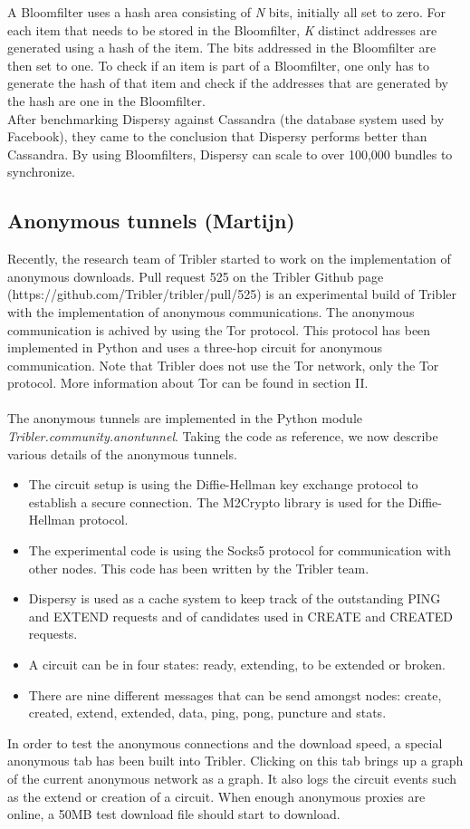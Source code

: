 \documentclass[11pt]{article}
\begin{document}
A Bloomfilter uses a hash area consisting of \emph{N} bits, initially all set to zero. For each item that needs to be stored in the Bloomfilter, \emph{K} distinct addresses are generated using a hash of the item. The bits addressed in the Bloomfilter are then set to one. To check if an item is part of a Bloomfilter, one only has to generate the hash of that item and check if the addresses that are generated by the hash are one in the Bloomfilter.\\

After benchmarking Dispersy against Cassandra (the database system used by Facebook), they came to the conclusion that Dispersy performs better than Cassandra. By using Bloomfilters, Dispersy can scale to over 100,000 bundles to synchronize.

\subsection{Anonymous tunnels (Martijn)}
\label{sec:anonymoustunnels}
Recently, the research team of Tribler started to work on the implementation of anonymous downloads. Pull request 525 on the Tribler Github page (https://github.com/Tribler/tribler/pull/525) is an experimental build of Tribler with the implementation of anonymous communications. The anonymous communication is achived by using the Tor protocol. This protocol has been implemented in Python and uses a three-hop circuit for anonymous communication. Note that Tribler does not use the Tor network, only the Tor protocol. More information about Tor can be found in section II.\\\\
The anonymous tunnels are implemented in the Python module \emph{Tribler.community.anontunnel}. Taking the code as reference, we now describe various details of the anonymous tunnels.
\begin{itemize} 
\item The circuit setup is using the Diffie-Hellman key exchange protocol to establish a secure connection. The M2Crypto library is used for the Diffie-Hellman protocol.
\item The experimental code is using the Socks5 protocol for communication with other nodes. This code has been written by the Tribler team.
\item Dispersy is used as a cache system to keep track of the outstanding PING and EXTEND requests and of candidates used in CREATE and CREATED requests.
\item A circuit can be in four states: ready, extending, to be extended or broken.
\item There are nine different messages that can be send amongst nodes: create, created, extend, extended, data, ping, pong, puncture and stats.
\end{itemize}
In order to test the anonymous connections and the download speed, a special anonymous tab has been built into Tribler. Clicking on this tab brings up a graph of the current anonymous network as a graph. It also logs the circuit events such as the extend or creation of a circuit. When enough anonymous proxies are online, a 50MB test download file should start to download.\\\\
\end{document}

